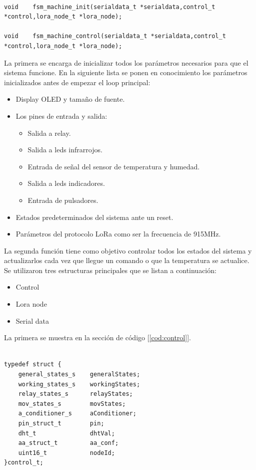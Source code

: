 \begin{lstlisting}[label=cod:fsm,caption=Funciones de la maquina de estados finitos]  % Start your code-block

void    fsm_machine_init(serialdata_t *serialdata,control_t *control,lora_node_t *lora_node);

void    fsm_machine_control(serialdata_t *serialdata,control_t *control,lora_node_t *lora_node);

\end{lstlisting}

La primera se encarga de inicializar todos los parámetros necesarios para que el sistema funcione. En la siguiente lista se ponen en conocimiento los parámetros inicializados antes de empezar el loop principal:

\begin{itemize}
\item Display OLED y tamaño de fuente.
\item Los pines de entrada y salida:
\begin{itemize}
\item Salida a relay.
\item Salida a leds infrarrojos.
\item Entrada de señal del sensor de temperatura y humedad.
\item Salida a leds indicadores.
\item Entrada de pulsadores.
\end{itemize}
\item Estados predeterminados del sistema ante un reset.
\item Parámetros del protocolo LoRa como ser la frecuencia de 915MHz.
\end{itemize}

La segunda función tiene como objetivo controlar todos los estados del sistema y actualizarlos cada vez que llegue un comando o que la temperatura se actualice. Se utilizaron tres estructuras principales que se listan a continuación:

\begin{itemize}
\item Control
\item Lora node
\item Serial data
\end{itemize}

La primera se muestra en la sección de código [\ref{cod:control}].

\begin{lstlisting}[label=cod:control,caption=Estructura de control del nodo] 

typedef struct {
    general_states_s    generalStates;
    working_states_s    workingStates;
    relay_states_s      relayStates;
    mov_states_s        movStates;
    a_conditioner_s     aConditioner;
    pin_struct_t        pin;
    dht_t               dhtVal;
    aa_struct_t         aa_conf;
    uint16_t            nodeId;
}control_t;

\end{lstlisting}

